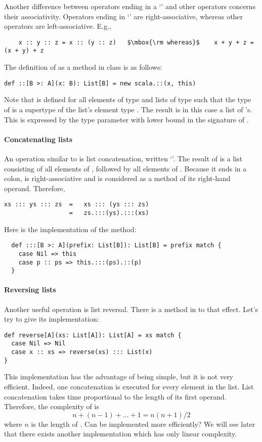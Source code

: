 Another difference between operators ending in a `\code{:}' and other
operators concerns their associativity.  Operators ending in
`\code{:}' are right-associative, whereas other operators are
left-associative.  E.g.,
\begin{lstlisting}
    x :: y :: z = x :: (y :: z)   $\mbox{\rm whereas}$    x + y + z = (x + y) + z
\end{lstlisting}
The definition of \code{::} as a method in
class  is as follows:
\begin{lstlisting}
def ::[B >: A](x: B): List[B] = new scala.::(x, this)
\end{lstlisting}
Note that \code{::} is defined for all elements  of type
 and lists of type  such that the type 
of  is a supertype of the list's element type . The result
is in this case a list of 's. This
is expressed by the type parameter  with lower bound 
in the signature of \code{::}. 

\paragraph{Concatenating lists}
An operation similar to \code{::} is list concatenation, written
`\code{:::}'. The result of  is a list consisting of
all elements of , followed by all elements of .
Because it ends in a colon, \code{:::} is right-associative and is
considered as a method of its right-hand operand. Therefore,
\begin{lstlisting}
xs ::: ys ::: zs  =   xs ::: (ys ::: zs)
                  =   zs.:::(ys).:::(xs)
\end{lstlisting}
Here is the implementation of the \code{:::} method:
\begin{lstlisting}
  def :::[B >: A](prefix: List[B]): List[B] = prefix match {
    case Nil => this
    case p :: ps => this.:::(ps).::(p)
  }
\end{lstlisting}


\paragraph{Reversing lists} Another useful operation
is list reversal. There is a method  in  to
that effect. Let's try to give its implementation:
\begin{lstlisting}
def reverse[A](xs: List[A]): List[A] = xs match {
  case Nil => Nil
  case x :: xs => reverse(xs) ::: List(x)
}
\end{lstlisting}
This implementation has the advantage of being simple, but it is not
very efficient.  Indeed, one concatenation is executed for every
element in the list. List concatenation takes time proportional to the
length of its first operand. Therefore, the complexity of
 is
\[
n + (n - 1) + ... + 1 = n(n+1)/2
\]
where $n$ is the length of . Can  be
implemented more efficiently? We will see later that there exists
another implementation which has only linear complexity.

